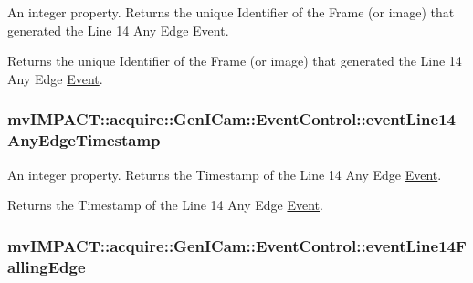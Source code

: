 An integer property. Returns the unique Identifier of the Frame (or image) that generated the Line 14 Any Edge \hyperlink{classmv_i_m_p_a_c_t_1_1acquire_1_1_event}{Event}. 

Returns the unique Identifier of the Frame (or image) that generated the Line 14 Any Edge \hyperlink{classmv_i_m_p_a_c_t_1_1acquire_1_1_event}{Event}. \hypertarget{classmv_i_m_p_a_c_t_1_1acquire_1_1_gen_i_cam_1_1_event_control_a9ef439b22a96cfdaa77641b6008f54c2}{
\subsubsection[{event\+Line14\+Any\+Edge\+Timestamp}]{ mv\+I\+M\+P\+A\+C\+T\+::acquire\+::\+Gen\+I\+Cam\+::\+Event\+Control\+::event\+Line14\+Any\+Edge\+Timestamp}}\label{classmv_i_m_p_a_c_t_1_1acquire_1_1_gen_i_cam_1_1_event_control_a9ef439b22a96cfdaa77641b6008f54c2}


An integer property. Returns the Timestamp of the Line 14 Any Edge \hyperlink{classmv_i_m_p_a_c_t_1_1acquire_1_1_event}{Event}. 

Returns the Timestamp of the Line 14 Any Edge \hyperlink{classmv_i_m_p_a_c_t_1_1acquire_1_1_event}{Event}. \hypertarget{classmv_i_m_p_a_c_t_1_1acquire_1_1_gen_i_cam_1_1_event_control_a4e6240a1a74c5fc7daa234f1b61dd777}{
\subsubsection[{event\+Line14\+Falling\+Edge}]{ mv\+I\+M\+P\+A\+C\+T\+::acquire\+::\+Gen\+I\+Cam\+::\+Event\+Control\+::event\+Line14\+Falling\+Edge}}\label{classmv_i_m_p_a_c_t_1_1acquire_1_1_gen_i_cam_1_1_event_control_a4e6240a1a74c5fc7daa234f1b61dd777}


